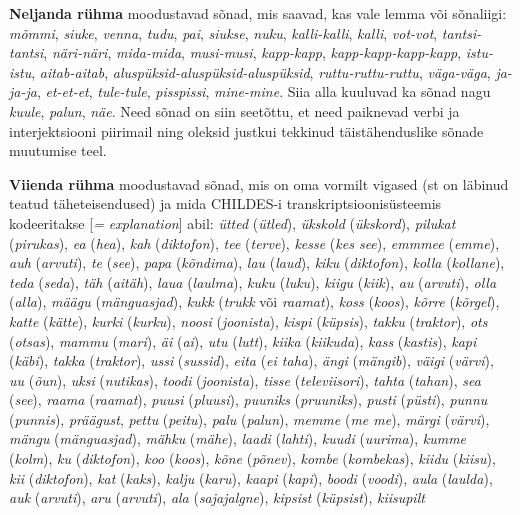 \documentclass[12pt]{article}
\begin{document}
\textbf{Neljanda rühma} moodustavad sõnad, mis saavad, kas vale lemma või sõnaliigi: 
\emph{mõmmi}, \emph{siuke}, \emph{venna}, \emph{tudu}, \emph{pai}, \emph{siukse}, \emph{nuku}, \emph{kalli-kalli}, \emph{kalli}, \emph{vot-vot}, \emph{tantsi-tantsi}, \emph{näri-näri}, \emph{mida-mida}, \emph{musi-musi}, \emph{kapp-kapp}, \emph{kapp-kapp-kapp-kapp}, \emph{istu-istu}, \emph{aitab-aitab}, \emph{aluspüksid-aluspüksid-aluspüksid}, \emph{ruttu-ruttu-ruttu}, \emph{väga-väga}, \emph{ja-ja-ja}, \emph{et-et-et}, \emph{tule-tule}, \emph{pisspissi}, \emph{mine-mine}. Siia alla kuuluvad ka sõnad nagu \emph{kuule}, \emph{palun}, \emph{näe}. Need sõnad on siin seetõttu, et need paiknevad verbi ja interjektsiooni piirimail ning oleksid justkui tekkinud täistähenduslike sõnade muutumise teel.

\textbf{Viienda rühma} moodustavad sõnad, mis on oma vormilt vigased (st on läbinud teatud täheteisendused) ja mida CHILDES-i transkriptsioonisüsteemis kodeeritakse [\emph{= explanation}] abil: \emph{ütted} (\emph{ütled}), \emph{ükskold} (\emph{ükskord}), \emph{pilukat} (\emph{pirukas}), \emph{ea} (\emph{hea}), \emph{kah} (\emph{diktofon}), \emph{tee} (\emph{terve}), \emph{kesse} (\emph{kes see}), \emph{emmmee} (\emph{emme}), \emph{auh} (\emph{arvuti}), \emph{te} (\emph{see}), \emph{papa} (\emph{kõndima}), \emph{lau} (\emph{laud}), \emph{kiku} (\emph{diktofon}), \emph{kolla} (\emph{kollane}), \emph{teda} (\emph{seda}), \emph{täh} (\emph{aitäh}), \emph{laua} (\emph{laulma}), \emph{kuku} (\emph{luku}), \emph{kiigu} (\emph{kiik}), \emph{au} (\emph{arvuti}), \emph{olla} (\emph{alla}), \emph{määgu} (\emph{mänguasjad}), \emph{kukk} (\emph{trukk} või \emph{raamat}), \emph{koss} (\emph{koos}), \emph{kõrre} (\emph{kõrgel}), \emph{katte} (\emph{kätte}), \emph{kurki} (\emph{kurku}), \emph{noosi} (\emph{joonista}), \emph{kispi} (\emph{küpsis}), \emph{takku} (\emph{traktor}), \emph{ots} (\emph{otsas}), \emph{mammu} (\emph{mari}), \emph{äi} (\emph{ai}), \emph{utu} (\emph{lutt}), \emph{kiika} (\emph{kiikuda}), \emph{kass} (\emph{kastis}), \emph{kapi} (\emph{käbi}), \emph{takka} (\emph{traktor}), \emph{ussi} (\emph{sussid}), \emph{eita} (\emph{ei taha}), \emph{ängi} (\emph{mängib}), \emph{väigi} (\emph{värvi}), \emph{uu} (\emph{õun}), \emph{uksi} (\emph{nutikas}), \emph{toodi} (\emph{joonista}), \emph{tisse} (\emph{televiisori}), \emph{tahta} (\emph{tahan}), \emph{sea} (\emph{see}), \emph{raama} (\emph{raamat}), \emph{puusi} (\emph{pluusi}), \emph{puuniks} (\emph{pruuniks}), \emph{pusti} (\emph{püsti}), \emph{punnu} (\emph{punnis}), \emph{präägust}, \emph{pettu} (\emph{peitu}), \emph{palu} (\emph{palun}), \emph{memme} (\emph{me me}), \emph{märgi} (\emph{värvi}), \emph{mängu} (\emph{mänguasjad}), \emph{mähku} (\emph{mähe}), \emph{laadi} (\emph{lahti}), \emph{kuudi} (\emph{uurima}), \emph{kumme} (\emph{kolm}), \emph{ku} (\emph{diktofon}), \emph{koo} (\emph{koos}), \emph{kõne} (\emph{põnev}), \emph{kombe} (\emph{kombekas}), \emph{kiidu} (\emph{kiisu}), \emph{kii} (\emph{diktofon}), \emph{kat} (\emph{kaks}), \emph{kalju} (\emph{karu}), \emph{kaapi} (\emph{kapi}), \emph{boodi} (\emph{voodi}), \emph{aula} (\emph{laulda}), \emph{auk} (\emph{arvuti}), \emph{aru} (\emph{arvuti}), \emph{ala} (\emph{sajajalgne}), \emph{kipsist} (\emph{küpsist}), \emph{kiisupilt} 
\end{document}
